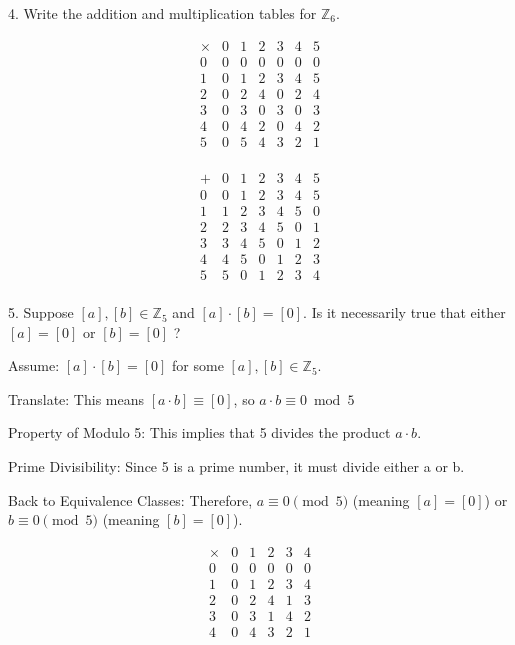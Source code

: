 \documentclass{hippoidC}
\begin{document}
\begin{prooflist}{4. Write the addition and multiplication tables for $\mathbb{Z}_6$.}
 \item \[
\begin{array}{c|cccccc}
\times & 0 & 1 & 2 & 3 & 4 & 5 \\
\hline
0 & 0 & 0 & 0 & 0 & 0 & 0 \\
1 & 0 & 1 & 2 & 3 & 4 & 5 \\
2 & 0 & 2 & 4 & 0 & 2 & 4 \\
3 & 0 & 3 & 0 & 3 & 0 & 3 \\
4 & 0 & 4 & 2 & 0 & 4 & 2 \\
5 & 0 & 5 & 4 & 3 & 2 & 1 \\
\end{array}
\]
\item \[
\begin{array}{c|cccccc}
+ & 0 & 1 & 2 & 3 & 4 & 5 \\
\hline
0 & 0 & 1 & 2 & 3 & 4 & 5 \\
1 & 1 & 2 & 3 & 4 & 5 & 0 \\
2 & 2 & 3 & 4 & 5 & 0 & 1 \\
3 & 3 & 4 & 5 & 0 & 1 & 2 \\
4 & 4 & 5 & 0 & 1 & 2 & 3 \\
5 & 5 & 0 & 1 & 2 & 3 & 4 \\
\end{array}
\]
\end{prooflist}

\begin{prooflist}{5. Suppose $[a],[b] \in \mathbb{Z}_5$ and $[a] \cdot[b]=[0]$.
    Is it necessarily true that either $[a]=[0]$ or $[b]=[0]$ ?}
\item Assume: $[a]\cdot[b]=[0]$ for some $[a],[b]\in\mathbb{Z}_5$.
\item Translate: This means $[a\cdot b]\equiv[0]$, so $a\cdot b\equiv 0\bmod 5$
\item Property of Modulo 5: This implies that 5 divides the product $a\cdot b$.
\item Prime Divisibility: Since 5 is a prime number, it must divide either a or b.
\item Back to Equivalence Classes: Therefore, $a \equiv 0 \pmod 5$ (meaning
$[a]=[0]$) or $b \equiv 0 \pmod 5$ (meaning $[b]=[0]$).
\item \[
\begin{array}{c|ccccc}
\times & 0 & 1 & 2 & 3 & 4 \\
\hline
0 & 0 & 0 & 0 & 0 & 0 \\
1 & 0 & 1 & 2 & 3 & 4 \\
2 & 0 & 2 & 4 & 1 & 3 \\
3 & 0 & 3 & 1 & 4 & 2 \\
4 & 0 & 4 & 3 & 2 & 1 \\
\end{array}
\]
\end{prooflist}
\end{document}

